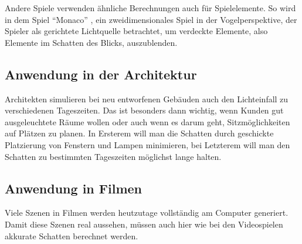 Andere Spiele verwenden ähnliche Berechnungen auch für Spielelemente. So wird in dem Spiel "`Monaco"' \cite{monaco2014},
ein zweidimensionales Spiel in der Vogelperspektive, der Spieler als gerichtete Lichtquelle betrachtet, um verdeckte
Elemente, also Elemente im Schatten des Blicks, auszublenden.

\subsection*{Anwendung in der Architektur}

Architekten simulieren bei neu entworfenen Gebäuden auch den Lichteinfall zu verschiedenen Tageszeiten.
Das ist besonders dann wichtig, wenn Kunden gut ausgeleuchtete Räume wollen oder auch wenn es darum geht,
Sitzmöglichkeiten auf Plätzen zu planen. In Ersterem will man die Schatten durch geschickte Platzierung
von Fenstern und Lampen minimieren, bei Letzterem will man den Schatten zu bestimmten Tageszeiten
möglichst lange halten.

\subsection*{Anwendung in Filmen}

Viele Szenen in Filmen werden heutzutage vollständig am Computer generiert. Damit diese Szenen
real aussehen, müssen auch hier wie bei den Videospielen akkurate Schatten berechnet werden.
